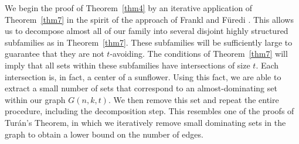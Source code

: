\documentclass[12pt,a4paper]{article}
\begin{document}
We begin the proof of Theorem~\ref{thm4} by an iterative application of Theorem~\ref{thm7} in the spirit of the approach of Frankl and F\"uredi \cite{FF}. This allows us to decompose almost all of our family into several disjoint highly structured subfamilies as in Theorem~\ref{thm7}. These subfamilies will be sufficiently large to guarantee that they are not $t$-avoiding. The conditions of Theorem~\ref{thm7} will imply that all sets within these subfamilies have intersections of size $t$. Each intersection is, in fact, a center of a sunflower. Using this fact, we are able to extract a small number of sets that correspond to an almost-dominating set within our graph 
$G(n,k,t)$. We then remove this set and repeat the entire procedure, including the decomposition step. This resembles one of the proofs of Tur\' an's Theorem, in which we iteratively remove small dominating  sets in the graph to obtain a lower bound on the number of edges. 
\end{document}
